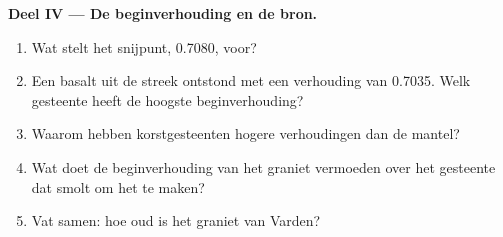 \begin{problem}
\medskip
\noindent\textbf{Deel IV --- De beginverhouding en de bron.}
\begin{enumerate}[resume]
  \item Wat stelt het snijpunt, 0.7080, voor?
  \item Een basalt uit de streek ontstond met een verhouding van 0.7035. Welk gesteente
        heeft de hoogste beginverhouding?
  \item Waarom hebben korstgesteenten hogere verhoudingen dan de mantel?
  \item Wat doet de beginverhouding van het graniet vermoeden over het gesteente dat
        smolt om het te maken?
  \item Vat samen: hoe oud is het graniet van Varden?
\end{enumerate}
\end{problem}

